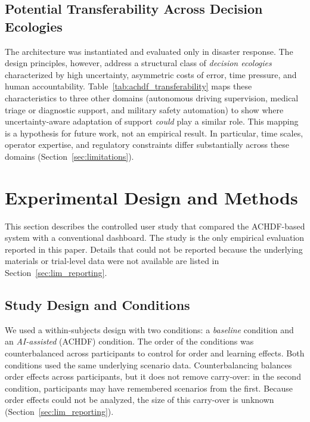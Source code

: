 \documentclass[journal]{IEEEtran}
\theoremstyle{plain}
\theoremstyle{definition}
\begin{document}
\subsection{Potential Transferability Across Decision Ecologies}
The architecture was instantiated and evaluated only in disaster response. The design principles, however, address a structural class of \emph{decision ecologies} characterized by high uncertainty, asymmetric costs of error, time pressure, and human accountability. Table~\ref{tab:achdf_transferability} maps these characteristics to three other domains (autonomous driving supervision, medical triage or diagnostic support, and military safety automation) to show where uncertainty-aware adaptation of support \emph{could} play a similar role. This mapping is a hypothesis for future work, not an empirical result. In particular, time scales, operator expertise, and regulatory constraints differ substantially across these domains (Section~\ref{sec:limitations}).

    \section{Experimental Design and Methods}

    This section describes the controlled user study that compared the ACHDF-based system with a conventional dashboard. The study is the only empirical evaluation reported in this paper. Details that could not be reported because the underlying materials or trial-level data were not available are listed in Section~\ref{sec:lim_reporting}.

    \subsection{Study Design and Conditions}

    We used a within-subjects design with two conditions: a \emph{baseline} condition and an \emph{AI-assisted} (ACHDF) condition. The order of the conditions was counterbalanced across participants to control for order and learning effects. Both conditions used the same underlying scenario data. Counterbalancing balances order effects across participants, but it does not remove carry-over: in the second condition, participants may have remembered scenarios from the first. Because order effects could not be analyzed, the size of this carry-over is unknown (Section~\ref{sec:lim_reporting}).
\end{document}
